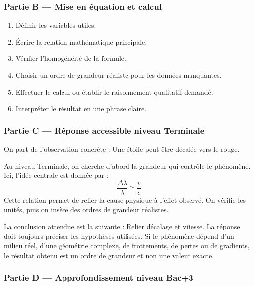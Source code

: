 \documentclass[11pt,a4paper]{article}
\begin{document}
\subsubsection*{Partie B — Mise en équation et calcul}

\begin{enumerate}
  \item Définir les variables utiles.
  \item Écrire la relation mathématique principale.
  \item Vérifier l'homogénéité de la formule.
  \item Choisir un ordre de grandeur réaliste pour les données manquantes.
  \item Effectuer le calcul ou établir le raisonnement qualitatif demandé.
  \item Interpréter le résultat en une phrase claire.
\end{enumerate}

\subsubsection*{Partie C — Réponse accessible niveau Terminale}

\begin{corrigebox}
On part de l'observation concrète : Une étoile peut être décalée vers le rouge.

Au niveau Terminale, on cherche d'abord la grandeur qui contrôle le phénomène. Ici, l'idée centrale est donnée par :
\[
\frac{\Delta\lambda}{\lambda}\simeq\frac{v}{c}
\]
Cette relation permet de relier la cause physique à l'effet observé. On vérifie les unités, puis on insère des ordres de grandeur réalistes.

La conclusion attendue est la suivante : Relier décalage et vitesse. La réponse doit toujours préciser les hypothèses utilisées. Si le phénomène dépend d'un milieu réel, d'une géométrie complexe, de frottements, de pertes ou de gradients, le résultat obtenu est un ordre de grandeur et non une valeur exacte.
\end{corrigebox}

\subsubsection*{Partie D — Approfondissement niveau Bac+3}
\end{document}
